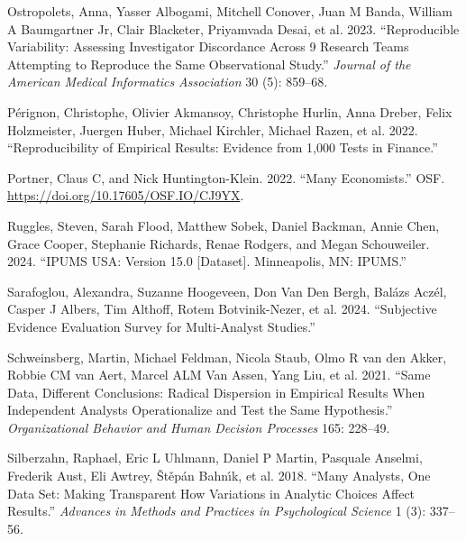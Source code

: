 \documentclass[
  letterpaper,
  DIV=11,
  numbers=noendperiod]{scrartcl}
\newlength{\cslhangindent}
\newlength{\cslentryspacingunit} %
\newenvironment{CSLReferences}[2] %
 {%
  \setlength{\parindent}{0pt}
  \ifodd #1
  \let\oldpar\par
  \def\par{\hangindent=\cslhangindent\oldpar}
  \fi
  \setlength{\parskip}{#2\cslentryspacingunit}
 }%
 {}
\begin{document}
\begin{CSLReferences}{1}{0}
\leavevmode{}%
Ostropolets, Anna, Yasser Albogami, Mitchell Conover, Juan M Banda,
William A Baumgartner Jr, Clair Blacketer, Priyamvada Desai, et al.
2023. {``Reproducible Variability: Assessing Investigator Discordance
Across 9 Research Teams Attempting to Reproduce the Same Observational
Study.''} \emph{Journal of the American Medical Informatics Association}
30 (5): 859--68.

\leavevmode{}%
Pérignon, Christophe, Olivier Akmansoy, Christophe Hurlin, Anna Dreber,
Felix Holzmeister, Juergen Huber, Michael Kirchler, Michael Razen, et
al. 2022. {``Reproducibility of Empirical Results: Evidence from 1,000
Tests in Finance.''}

\leavevmode{}%
Portner, Claus C, and Nick Huntington-Klein. 2022. {``Many
Economists.''} OSF. \url{https://doi.org/10.17605/OSF.IO/CJ9YX}.

\leavevmode{}%
Ruggles, Steven, Sarah Flood, Matthew Sobek, Daniel Backman, Annie Chen,
Grace Cooper, Stephanie Richards, Renae Rodgers, and Megan Schouweiler.
2024. {``IPUMS USA: Version 15.0 {[}Dataset{]}. Minneapolis, MN:
IPUMS.''}

\leavevmode{}%
Sarafoglou, Alexandra, Suzanne Hoogeveen, Don Van Den Bergh, Balázs
Aczél, Casper J Albers, Tim Althoff, Rotem Botvinik-Nezer, et al. 2024.
{``Subjective Evidence Evaluation Survey for Multi-Analyst Studies.''}

\leavevmode{}%
Schweinsberg, Martin, Michael Feldman, Nicola Staub, Olmo R van den
Akker, Robbie CM van Aert, Marcel ALM Van Assen, Yang Liu, et al. 2021.
{``Same Data, Different Conclusions: Radical Dispersion in Empirical
Results When Independent Analysts Operationalize and Test the Same
Hypothesis.''} \emph{Organizational Behavior and Human Decision
Processes} 165: 228--49.

\leavevmode{}%
Silberzahn, Raphael, Eric L Uhlmann, Daniel P Martin, Pasquale Anselmi,
Frederik Aust, Eli Awtrey, Štěpán Bahnı́k, et al. 2018. {``Many Analysts,
One Data Set: Making Transparent How Variations in Analytic Choices
Affect Results.''} \emph{Advances in Methods and Practices in
Psychological Science} 1 (3): 337--56.


\end{CSLReferences}
\end{document}
